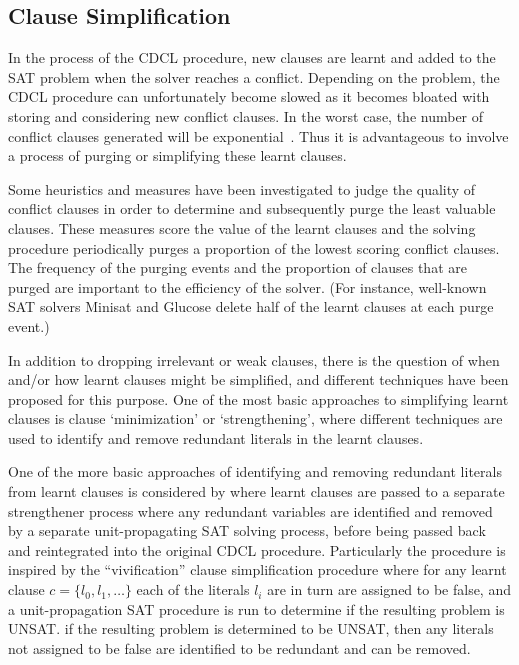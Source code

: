 \documentclass[
10pt, %
a4paper, %
oneside, %
headinclude,footinclude, %
BCOR5mm, %
]{scrartcl}
\begin{document}
\subsection{Clause Simplification}\label{sec:simplification}

In the process of the CDCL procedure, new clauses are learnt and added to the SAT problem when the solver reaches a conflict.
Depending on the problem, the CDCL procedure can unfortunately become slowed as it becomes bloated with storing and considering new conflict clauses.
In the worst case, the number of conflict clauses generated will be exponential~\cite{DBLP:journals/corr/LonlacN17,6984546}.
Thus it is advantageous to involve a process of purging or simplifying these learnt clauses.

Some heuristics and measures have been investigated to judge the quality of conflict clauses in order to determine and subsequently purge the least valuable clauses.\cite{DBLP:journals/corr/LonlacN17,6984546}
These measures score the value of the learnt clauses and the solving procedure periodically purges a proportion of the lowest scoring conflict clauses.
The frequency of the purging events and the proportion of clauses that are purged are important to the efficiency of the solver.
(For instance, well-known SAT solvers Minisat and Glucose delete half of the learnt clauses at each purge event.)

In addition to dropping irrelevant or weak clauses, there is the question of when and/or how learnt clauses might be simplified, and different techniques have been proposed for this
purpose.\cite{ijcai2017-98}
One of the most basic approaches to simplifying learnt clauses is clause `minimization' or `strengthening', where different techniques are used to 
identify and remove redundant literals in the learnt clauses.\cite{10.1007/978-3-642-02777-2_23}

One of the more basic approaches of identifying and removing redundant literals from learnt clauses is considered by \cite{DBLP:conf/sat/WieringaH13}
 where learnt clauses are passed to a separate strengthener process where any redundant variables are identified and removed by a separate unit-propagating SAT solving process, before being 
passed back and reintegrated into the original CDCL procedure.
Particularly the procedure is inspired by the ``vivification'' clause simplification procedure \cite{DBLP:conf/ecai/PietteHS08} where for any learnt clause $c = \{l_0,l_1,\dots\}$
each of the literals $l_i$ are in turn are assigned to be false, and a unit-propagation SAT procedure is run to determine if the resulting problem is UNSAT.
if the resulting problem is determined to be UNSAT, then any literals not assigned to be false are identified to be redundant and can be removed.
\end{document}
